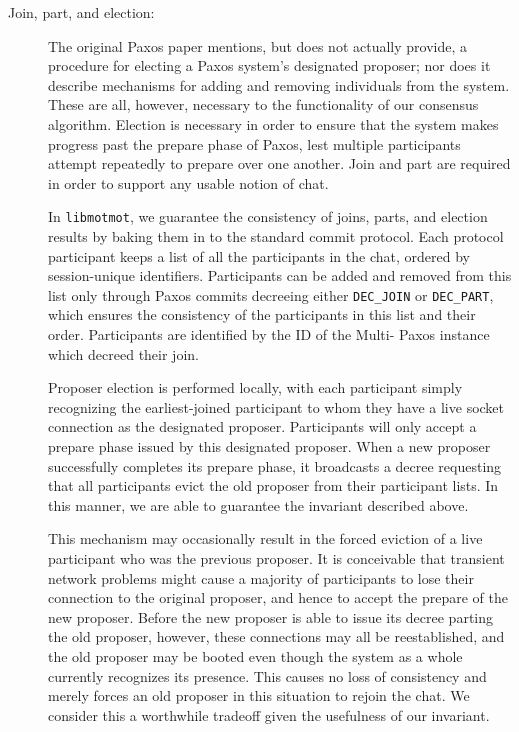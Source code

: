 \documentclass{sig-alternate}
\newcommand\libmotmot{\texttt{libmotmot}\xspace}
\begin{document}
\begin{description}
  \item[Join, part, and election:]
    The original Paxos paper mentions, but does not actually provide, a
    procedure for electing a Paxos system's designated proposer; nor does it
    describe mechanisms for adding and removing individuals from the system.
    These are all, however, necessary to the functionality of our consensus
    algorithm.  Election is necessary in order to ensure that the system makes
    progress past the prepare phase of Paxos, lest multiple participants
    attempt repeatedly to prepare over one another.  Join and part are required
    in order to support any usable notion of chat.

    In \libmotmot, we guarantee the consistency of joins, parts, and election
    results by baking them in to the standard commit protocol.  Each protocol
    participant keeps a list of all the participants in the chat, ordered
    by session-unique identifiers.  Participants can be added and removed from
    this list only through Paxos commits decreeing either \verb`DEC_JOIN` or
    \verb`DEC_PART`, which ensures the consistency of the participants in this
    list and their order.  Participants are identified by the ID of the Multi-%
    Paxos instance which decreed their join.

    Proposer election is performed locally, with each participant simply
    recognizing the earliest-joined participant to whom they have a live socket
    connection as the designated proposer.  Participants will only accept a
    prepare phase issued by this designated proposer.  When a new proposer
    successfully completes its prepare phase, it broadcasts a decree requesting
    that all participants evict the old proposer from their participant lists.
    In this manner, we are able to guarantee the invariant described above.

    This mechanism may occasionally result in the forced eviction of a live
    participant who was the previous proposer.  It is conceivable that transient
    network problems might cause a majority of participants to lose their
    connection to the original proposer, and hence to accept the prepare of
    the new proposer.  Before the new proposer is able to issue its decree
    parting the old proposer, however, these connections may all be
    reestablished, and the old proposer may be booted even though the system
    as a whole currently recognizes its presence.  This causes no loss of
    consistency and merely forces an old proposer in this situation to rejoin
    the chat.  We consider this a worthwhile tradeoff given the usefulness
    of our invariant.


\end{description}
\end{document}
